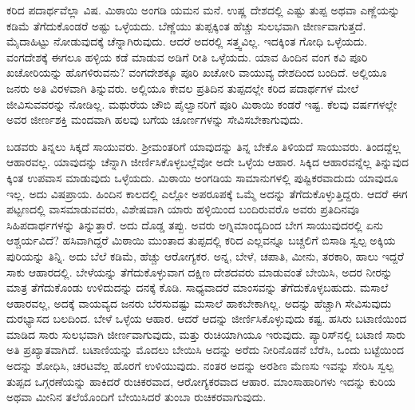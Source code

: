 ಕರಿದ ಪದಾರ್ಥವೆಲ್ಲಾ ವಿಷ. ಮಿಠಾಯಿ ಅಂಗಡಿ ಯಮನ ಮನೆ. ಉಷ್ಣ ದೇಶದಲ್ಲಿ ಎಷ್ಟು ತುಪ್ಪ ಅಥವಾ ಎಣ್ಣೆಯನ್ನು ಕಡಿಮೆ ತೆಗೆದುಕೊಂಡರೆ ಅಷ್ಟು ಒಳ್ಳೆಯದು. ಬೆಣ್ಣೆಯು ತುಪ್ಪಕ್ಕಿಂತ ಹೆಚ್ಚು ಸುಲಭವಾಗಿ ಜೀರ್ಣವಾಗುತ್ತದೆ. ಮೈದಾಹಿಟ್ಟು ನೋಡುವುದಕ್ಕೆ ಚೆನ್ನಾಗಿರುವುದು. ಆದರೆ ಅದರಲ್ಲಿ ಸತ್ತ್ವವಿಲ್ಲ. ಇದಕ್ಕಿಂತ ಗೋಧಿ ಒಳ್ಳೆಯದು. ವಂಗದೇಶಕ್ಕೆ ಈಗಲೂ ಹಳ್ಳಿಯ ಕಡೆ ಮಾಡುವ ಅಡಿಗೆ ರೀತಿ ಒಳ್ಳೆಯದು. ಯಾವ ಹಿಂದಿನ ವಂಗ ಕವಿ ಪೂರಿ ಖಚೋರಿಯನ್ನು ಹೊಗಳಿರುವನು? ವಂಗದೇಶಕ್ಕೂ ಪೂರಿ ಖಚೋರಿ ವಾಯುವ್ಯ ದೇಶದಿಂದ ಬಂದಿದೆ. ಅಲ್ಲಿಯೂ ಜನರು ಅತಿ ವಿರಳವಾಗಿ ತಿನ್ನುವರು. ಅಲ್ಲಿಯೂ ಕೇವಲ ಪ್ರತಿದಿನ ತುಪ್ಪದಲ್ಲೇ ಕರಿದ ಪದಾರ್ಥಗಳ ಮೇಲೆ ಜೀವಿಸುವವರನ್ನು ನೋಡಿಲ್ಲ. ಮಥುರೆಯ ಚೌಬಿ ಪೈಲ್ವಾನರಿಗೆ ಪೂರಿ ಮಿಠಾಯಿ ಕಂಡರೆ ಇಷ್ಟ. ಕೆಲವು ವರ್ಷಗಳಲ್ಲೇ ಅವರ ಜೀರ್ಣಶಕ್ತಿ ಮಂದವಾಗಿ ಹಲವು ಬಗೆಯ ಚೂರ್ಣಗಳನ್ನು ಸೇವಿಸಬೇಕಾಗುವುದು.

ಬಡವರು ತಿನ್ನಲು ಸಿಕ್ಕದೆ ಸಾಯುವರು. ಶ‍್ರೀಮಂತರಿಗೆ ಯಾವುದನ್ನು ತಿನ್ನ ಬೇಕೊ ತಿಳಿಯದೆ ಸಾಯುವರು. ತಿಂದದ್ದೆಲ್ಲ ಆಹಾರವಲ್ಲ. ಯಾವುದನ್ನು ಚೆನ್ನಾಗಿ ಜೀರ್ಣಿಸಿಕೊಳ್ಳಬಲ್ಲೆವೋ ಅದೇ ಒಳ್ಳೆಯ ಆಹಾರ. ಸಿಕ್ಕಿದ ಆಹಾರವನ್ನೆಲ್ಲ ತಿನ್ನುವುದ ಕ್ಕಿಂತ ಉಪವಾಸ ಮಾಡುವುದು ಒಳ್ಳೆಯದು. ಮಿಠಾಯಿ ಅಂಗಡಿಯ ಸಾಮಾನುಗಳಲ್ಲಿ ಪುಷ್ಟಿಕರವಾದುದು ಯಾವುದೂ ಇಲ್ಲ. ಅದು ವಿಷಪ್ರಾಯ. ಹಿಂದಿನ ಕಾಲದಲ್ಲಿ ಎಲ್ಲೋ ಅಪರೂಪಕ್ಕೆ ಒಮ್ಮೆ ಅದನ್ನು ತೆಗೆದುಕೊಳ್ಳುತ್ತಿದ್ದರು. ಆದರೆ ಈಗ ಪಟ್ಟಣದಲ್ಲಿ ವಾಸಮಾಡು\break ವವರು, ವಿಶೇಷವಾಗಿ ಯಾರು ಹಳ್ಳಿಯಿಂದ ಬಂದಿರುವರೊ ಅವರು ಪ್ರತಿದಿನವೂ ಸಿಹಿಪದಾರ್ಥಗಳನ್ನು ತಿನ್ನುತ್ತಾರೆ. ಅದು ದೊಡ್ಡ ತಪ್ಪು. ಅವರು ಅಗ್ನಿಮಾಂದ್ಯದಿಂದ ಬೇಗ ಸಾಯುವುದರಲ್ಲಿ ಏನು ಆಶ್ಚರ್ಯವಿದೆ? ಹಸಿವಾಗಿದ್ದರೆ ಮಿಠಾಯಿ ಮುಂತಾದ ತುಪ್ಪದಲ್ಲಿ ಕರಿದ ಎಲ್ಲವನ್ನೂ ಬಚ್ಚಲಿಗೆ ಬಿಸಾಡಿ ಸ್ವಲ್ಪ ಅಕ್ಕಿಯ ಪುರಿಯನ್ನು ತಿನ್ನಿ. ಅದು ಬೆಲೆ ಕಡಿಮೆ, ಹೆಚ್ಚು ಆರೋಗ್ಯಕರ. ಅನ್ನ, ಬೇಳೆ, ಚಪಾತಿ, ಮೀನು, ತರಕಾರಿ, ಹಾಲು ಇದ್ದರೆ ಸಾಕು ಆಹಾರದಲ್ಲಿ. ಬೇಳೆಯನ್ನು ತೆಗೆದುಕೊಳ್ಳುವಾಗ ದಕ್ಷಿಣ ದೇಶದವರು ಮಾಡುವಂತೆ ಬೇಯಿಸಿ, ಅದರ ನೀರನ್ನು ಮಾತ್ರ ತೆಗೆದುಕೊಂಡು ಉಳಿದುದನ್ನು ದನಕ್ಕೆ ಕೊಡಿ. ಸಾಧ್ಯವಾದರೆ ಮಾಂಸವನ್ನು ತೆಗೆದುಕೊಳ್ಳಬಹುದು. ಮಸಾಲೆ ಆಹಾರವಲ್ಲ, ಅದಕ್ಕೆ ವಾಯವ್ಯದ ಜನರು ಬೆರಸುವಷ್ಟು ಮಸಾಲೆ ಹಾಕಬೇಕಾಗಿಲ್ಲ. ಅದನ್ನು ಹೆಚ್ಚಾಗಿ ಸೇವಿಸುವುದು ದುರಭ್ಯಾಸದ ಬಲದಿಂದ. ಬೇಳೆ ಒಳ್ಳೆಯ ಆಹಾರ. ಆದರೆ ಆದನ್ನು ಜೀರ್ಣಿಸಿಕೊಳ್ಳುವುದು ಕಷ್ಟ. ಹಸಿರು ಬಟಾಣಿಯಿಂದ ಮಾಡಿದ ಸಾರು ಸುಲಭವಾಗಿ ಜೀರ್ಣವಾಗುವುದು, ಮತ್ತು ರುಚಿಯಾಗಿಯೂ ಇರುವುದು. ಪ್ಯಾರಿಸ್​ನಲ್ಲಿ ಬಟಾಣಿ ಸಾರು ಅತಿ ಪ್ರಖ್ಯಾತವಾಗಿದೆ. ಬಟಾಣಿಯನ್ನು ಮೊದಲು ಬೇಯಿಸಿ ಅದನ್ನು ಅರೆದು ನೀರಿನೊಡನೆ ಬೆರೆಸಿ, ಒಂದು ಬಟ್ಟೆಯಿಂದ ಅದನ್ನು ಶೋಧಿಸಿ, ಚರಟವೆಲ್ಲ ಹೊರಗೆ ಉಳಿಯುವುದು. ನಂತರ ಅದನ್ನು ಅರಶಿಣ ಮೆಣಸು ಇವನ್ನು ಸೇರಿಸಿ ಸ್ವಲ್ಪ ತುಪ್ಪದ ಒಗ್ಗರಣೆಯನ್ನು ಹಾಕಿದರೆ ರುಚಿಕರವಾದ, ಆರೋಗ್ಯಕರವಾದ ಆಹಾರ. ಮಾಂಸಾಹಾರಿಗಳು ಇದನ್ನು ಕುರಿಯ ಅಥವಾ ಮೀನಿನ ತಲೆಯೊಂದಿಗೆ ಬೇಯಿಸಿದರೆ ತುಂಬಾ ರುಚಿಕರವಾಗುವುದು.

